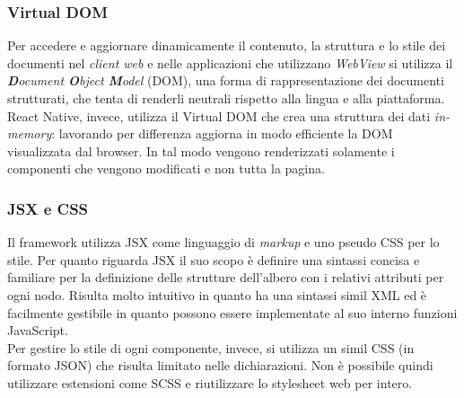\subsubsection{Virtual DOM}
Per accedere e aggiornare dinamicamente il contenuto, la struttura e lo stile dei documenti nel \emph{client web} e nelle applicazioni che utilizzano \emph{WebView} si utilizza il \emph{\textbf{D}ocument \textbf{O}bject \textbf{M}odel} (\acrshort{DOM}), una forma di rappresentazione dei documenti strutturati, che tenta di renderli neutrali rispetto alla lingua e alla piattaforma. React Native, invece, utilizza il Virtual DOM che crea una struttura dei dati\emph{ in-memory}: lavorando per differenza aggiorna in modo efficiente la DOM visualizzata dal browser. In tal modo vengono renderizzati solamente i componenti che vengono modificati e non tutta la pagina.
\subsubsection{JSX e CSS}
Il framework utilizza JSX come linguaggio di \emph{markup} e uno pseudo CSS per lo stile.
Per quanto riguarda JSX il suo scopo è definire una sintassi concisa e familiare per la definizione delle strutture dell'albero con i relativi attributi per ogni nodo. Risulta molto intuitivo in quanto ha una sintassi simil XML ed è facilmente gestibile in quanto possono essere implementate al suo interno funzioni JavaScript.\\
Per gestire lo stile di ogni componente, invece,  si utilizza un simil CSS (in formato JSON) che risulta limitato nelle dichiarazioni. Non è possibile quindi utilizzare estensioni come SCSS e riutilizzare lo stylesheet web per intero. 


